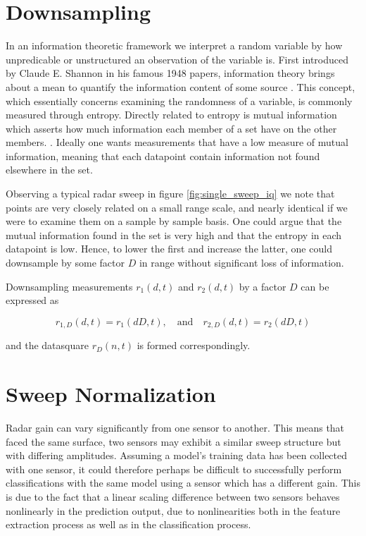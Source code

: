 \section{Downsampling}
\label{downsampling}

In an information theoretic framework we interpret a random variable by how unpredicable or unstructured an observation of the variable is\citep{anderson_johnnesson_2006}. First introduced by Claude E. Shannon in his famous 1948 papers, information theory brings about a mean to quantify the information content of some source \citep{shannon_1948}. This concept, which essentially concerns examining the randomness of a variable, is commonly measured through entropy. Directly related to entropy is mutual information which asserts how much information each member of a set have on the other members. \citep{hyvasrinen_karhunen_oja_2004}. Ideally one wants measurements that have a low measure of mutual information, meaning that each datapoint contain information not found elsewhere in the set. 

Observing a typical radar sweep in figure \ref{fig:single_sweep_iq} we note that points are very closely related on a small range scale, and nearly identical if we were to examine them on a sample by sample basis. One could argue that the mutual information found in the set is very high and that the entropy in each datapoint is low. Hence, to lower the first and increase the latter, one could downsample by some factor $D$ in range without significant loss of information.

Downsampling measurements $r_1(d,t)$ and $r_2(d,t)$ by a factor $D$ can be expressed as

\begin{equation}
	r_{1,D}(d, t) = r_{1}(dD,t), 
	\quad \text{and} \quad r_{2,D}(d,t) = r_{2}(dD,t)
\end{equation}

and the datasquare $r_D(n,t)$ is formed correspondingly.

\section{Sweep Normalization}

Radar gain can vary significantly from one sensor to another. This means that faced the same surface, two sensors may exhibit a similar sweep structure but with differing amplitudes. Assuming a model's training data has been collected with one sensor, it could therefore perhaps be difficult to successfully perform classifications with the same model using a sensor which has a different gain. This is due to the fact that a linear scaling difference between two sensors behaves nonlinearly in the prediction output, due to nonlinearities both in the feature extraction process as well as in the classification process.

